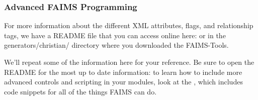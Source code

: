 \subsubsection[advanced-faims-programming]{Advanced FAIMS Programming}


For more information about the different XML attributes, flags, and relationship tags, we have a README file that you can access online here: \from[url24] or in the generators/christian/ directory where you downloaded the FAIMS-Tools.

We'll repeat some of the information here for your reference. Be sure to open the README for the most up to date information: to learn how to include more advanced controls and scripting in your modules, look at the \from[url25], which includes code snippets for all of the things FAIMS can do.

